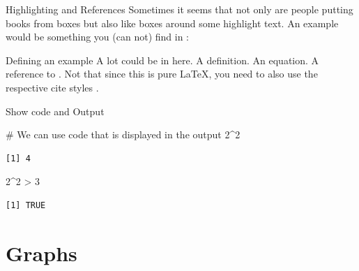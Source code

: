 \documentclass[11pt, aspectratio=169, t]{beamer}
\newenvironment{Shaded}{\begin{snugshade}}{\end{snugshade}}
\newcommand{\CommentTok}[1]{\textcolor[rgb]{0.37,0.37,0.37}{#1}}
\newcommand{\DecValTok}[1]{\textcolor[rgb]{0.68,0.00,0.00}{#1}}
\newcommand{\SpecialCharTok}[1]{\textcolor[rgb]{0.37,0.37,0.37}{#1}}
\begin{document}
\begin{frame}{Highlighting and References}
\label{highlighting-and-references}
Sometimes it seems that not only are people putting books from boxes but
also like boxes around some highlight text. An example would be
something you (can not) find in
\textcite[EJHE]{reifSettingIncentivesRight2025}:

\begin{exampleblock}{Defining an example}
\normalsize A lot could be in here. A definition. An equation.  A reference to \textcite[EJHE]{reifSettingIncentivesRight2025}. Not that since this is pure \LaTeX, you need to also use the respective cite styles \autocites[EJHE]{reifSettingIncentivesRight2025}. 
\end{exampleblock}
\end{frame}

\begin{frame}[fragile]{Show code and Output}
\label{show-code-and-output}
\begin{Shaded}
\begin{Highlighting}[]
\CommentTok{\# We can use code that is displayed in the output}
\DecValTok{2}\SpecialCharTok{\^{}}\DecValTok{2}
\end{Highlighting}
\end{Shaded}

\begin{verbatim}
[1] 4
\end{verbatim}

\begin{Shaded}
\begin{Highlighting}[]
\DecValTok{2}\SpecialCharTok{\^{}}\DecValTok{2} \SpecialCharTok{\textgreater{}} \DecValTok{3}
\end{Highlighting}
\end{Shaded}

\begin{verbatim}
[1] TRUE
\end{verbatim}
\end{frame}

\section{Graphs}\label{graphs}
\end{document}

